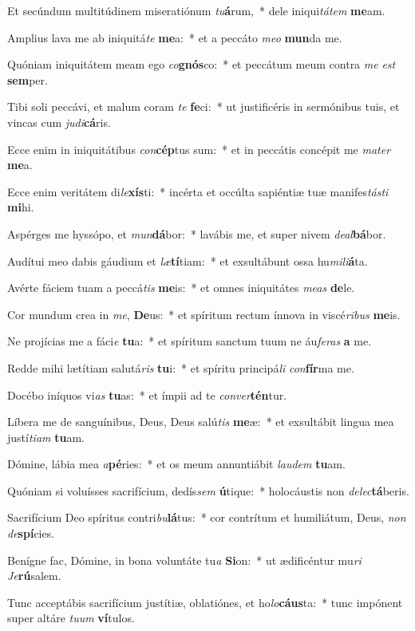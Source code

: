 \item Et secúndum multitúdinem miseratiónum \textit{tu}\textbf{á}rum,~* dele iniqui\textit{tá}\textit{tem} \textbf{me}am.
\item Amplius lava me ab iniquitá\textit{te} \textbf{me}a:~* et a peccáto \textit{me}\textit{o} \textbf{mun}da me.
\item Quóniam iniquitátem meam ego \textit{co}\textbf{gnós}co:~* et peccátum meum contra \textit{me} \textit{est} \textbf{sem}per.
\item Tibi soli peccávi, et malum coram \textit{te} \textbf{fe}ci:~* ut justificéris in sermónibus tuis, et vincas cum \textit{ju}\textit{di}\textbf{cá}ris.
\item Ecce enim in iniquitátibus \textit{con}\textbf{cép}tus sum:~* et in peccátis concépit me \textit{ma}\textit{ter} \textbf{me}a.
\item Ecce enim veritátem di\textit{le}\textbf{xís}ti:~* incérta et occúlta sapiéntiæ tuæ manifes\textit{tás}\textit{ti} \textbf{mi}hi.
\item Aspérges me hyssópo, et \textit{mun}\textbf{dá}bor:~* lavábis me, et super nivem \textit{de}\textit{al}\textbf{bá}bor.
\item Audítui meo dabis gáudium et \textit{læ}\textbf{tí}tiam:~* et exsultábunt ossa hu\textit{mi}\textit{li}\textbf{á}ta.
\item Avérte fáciem tuam a peccá\textit{tis} \textbf{me}is:~* et omnes iniquitátes \textit{me}\textit{as} \textbf{de}le.
\item Cor mundum crea in \textit{me}, \textbf{De}us:~* et spíritum rectum ínnova in viscé\textit{ri}\textit{bus} \textbf{me}is.
\item Ne projícias me a fáci\textit{e} \textbf{tu}a:~* et spíritum sanctum tuum ne áu\textit{fe}\textit{ras} \textbf{a} me.
\item Redde mihi lætítiam salutá\textit{ris} \textbf{tu}i:~* et spíritu principá\textit{li} \textit{con}\textbf{fír}ma me.
\item Docébo iníquos vi\textit{as} \textbf{tu}as:~* et ímpii ad te \textit{con}\textit{ver}\textbf{tén}tur.
\item Líbera me de sanguínibus, Deus, Deus salú\textit{tis} \textbf{me}æ:~* et exsultábit lingua mea justí\textit{ti}\textit{am} \textbf{tu}am.
\item Dómine, lábia mea \textit{a}\textbf{pé}ries:~* et os meum annuntiábit \textit{lau}\textit{dem} \textbf{tu}am.
\item Quóniam si voluísses sacrifícium, dedís\textit{sem} \textbf{ú}tique:~* holocáustis non \textit{de}\textit{lec}\textbf{tá}beris.
\item Sacrifícium Deo spíritus contri\textit{bu}\textbf{lá}tus:~* cor contrítum et humiliátum, Deus, \textit{non} \textit{de}\textbf{spí}cies.
\item Benígne fac, Dómine, in bona voluntáte tu\textit{a} \textbf{Si}on:~* ut ædificéntur mu\textit{ri} \textit{Je}\textbf{rú}salem.
\item Tunc acceptábis sacrifícium justítiæ, oblatiónes, et ho\textit{lo}\textbf{cáus}ta:~* tunc impónent super altáre \textit{tu}\textit{um} \textbf{ví}tulos.
